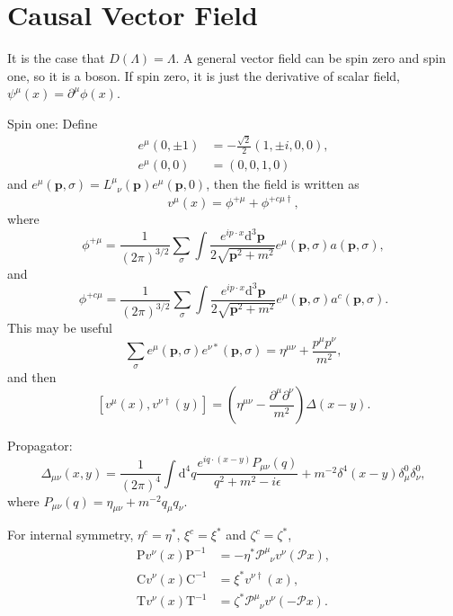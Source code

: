 \documentclass[10pt]{article}
\begin{document}
\section{Causal Vector Field}
It is the case that $D(\Lambda)=\Lambda$. A general vector field can be spin zero and spin one, so it is a boson. If spin zero, it is just the derivative of scalar field, $\psi^\mu(x)=\partial^\mu \phi(x)$.

Spin one: Define
\[
\begin{split}
	e^\mu(0,\pm 1)&=-\frac{\sqrt{2}}{2}(1,\pm i,0,0),\\
	e^\mu(0,0)&=(0,0,1,0)
\end{split}
\]
and $e^\mu(\bm{p},\sigma)=L^\mu_{\phantom{\mu}\nu}(\bm{p})e^\mu(\bm{p},0)$, then the field is written as 
\[
	v^\mu(x)=\phi^{+\mu}+\phi^{+c\mu\dag},
\]
where
\[
	\phi^{+\mu}=\frac{1}{(2\pi)^{3/2}}\sum_{\sigma}\int \frac{e^{ip\cdot x}\mathrm{d}^3\bm{p}}{2\sqrt{\bm{p}^2+m^2}}e^\mu(\bm{p},\sigma)a(\bm{p},\sigma),
\]
and
\[
	\phi^{+c\mu}=\frac{1}{(2\pi)^{3/2}}\sum_{\sigma}\int \frac{e^{ip\cdot x}\mathrm{d}^3\bm{p}}{2\sqrt{\bm{p}^2+m^2}}e^\mu(\bm{p},\sigma)a^c(\bm{p},\sigma).
\]
This may be useful
\[
	\sum_{\sigma} e^\mu(\bm{p},\sigma)e^{\nu*}(\bm{p},\sigma)=\eta^{\mu\nu}+\frac{p^\mu p^\nu}{m^2},
\]
and then
\[
	[v^\mu(x),v^{\nu\dag}(y)]=\left(\eta^{\mu\nu}-\frac{\partial^\mu \partial^\nu}{m^2}\right)\Delta(x-y).
\]

Propagator:
\[
	\Delta_{\mu\nu}(x,y)=\frac{1}{(2\pi)^4}\int \mathrm{d}^4q \frac{e^{iq\cdot (x-y)}P_{\mu\nu}(q)}{q^2+m^2-i\epsilon}+m^{-2}\delta^4(x-y)\delta^0_\mu \delta^0_\nu,
\]
where $P_{\mu\nu}(q)=\eta_{\mu\nu}+m^{-2}q_\mu q_\nu$.

For internal symmetry, $\eta^c=\eta^*$, $\xi^c=\xi^*$ and $\zeta^c=\zeta^*$,
\[
\begin{split}
	\mathrm{P}v^\nu(x)\mathrm{P}^{-1}&=-\eta^*\mathscr{P}^\mu_{\phantom{\mu}\nu}v^\nu(\mathscr{P}x),\\
	\mathrm{C}v^\nu(x)\mathrm{C}^{-1}&=\xi^*v^{\nu\dag}(x),\\
	\mathrm{T}v^\nu(x)\mathrm{T}^{-1}&=\zeta^*\mathscr{P}^\mu_{\phantom{\mu}\nu}v^\nu(-\mathscr{P}x).
\end{split}
\]
\end{document}
